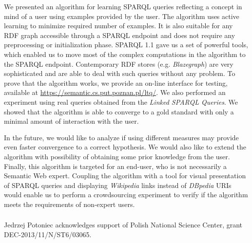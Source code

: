 \documentclass{llncs}
\begin{document}
We presented an algorithm for learning SPARQL queries reflecting a concept in mind of a user using examples provided by the user.
The algorithm uses active learning to minimize required number of examples.
It is also suitable for any RDF graph accessible through a SPARQL endpoint and does not require any preprocessing or initialization phase.
SPARQL 1.1 gave us a set of powerful tools, which enabled us to move most of the complex computations in the algorithm to the SPARQL endpoint.
Contemporary RDF stores (e.g. \emph{Blazegraph}) are very sophisticated and are able to deal with such queries without any problem.
To prove that the algorithm works, we provide an on-line interface for testing, available at \url{https://semantic.cs.put.poznan.pl/ltq/}.
We also performed an experiment using real queries obtained from the \emph{Linked SPARQL Queries}. We showed that the algorithm is able to converge to a gold standard with only a minimal amount of interaction with the user.

In the future, we would like to analyze if using different measures may provide even faster convergence to a correct hypothesis.
We would also like to extend the algorithm with possibility of obtaining some prior knowledge from the user.
Finally, this algorithm is targeted for an end-user, who is not necessarily a Semantic Web expert.
Coupling the algorithm with a tool for visual presentation of SPARQL queries and displaying \emph{Wikipedia} links instead of \emph{DBpedia} URIs would enable us to perform a crowdsourcing experiment to verify if the algorithm meets the requirements of non-expert users.

\subsubsection*{\ackname}
Jedrzej Potoniec acknowledges support of Polish National Science Center, grant DEC-2013/11/N/ST6/03065.



\end{document}
